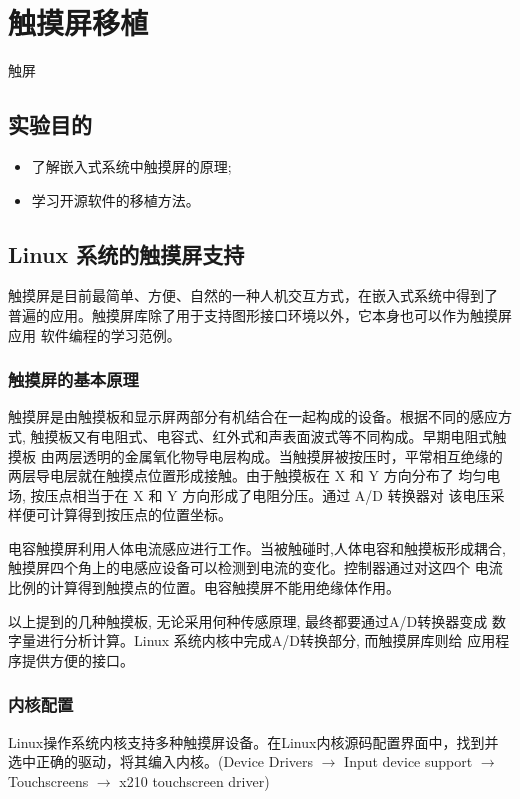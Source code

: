 \chapter{触摸屏移植}{触屏}\label{ch-ts}

\section{实验目的}
\begin{itemize}
  \item 了解嵌入式系统中触摸屏的原理;
  \item 学习开源软件的移植方法。
\end{itemize}

\section{Linux 系统的触摸屏支持}
触摸屏是目前最简单、方便、自然的一种人机交互方式，在嵌入式系统中得到了
普遍的应用。触摸屏库除了用于支持图形接口环境以外，它本身也可以作为触摸屏应用
软件编程的学习范例。

\subsection{触摸屏的基本原理}
触摸屏是由触摸板和显示屏两部分有机结合在一起构成的设备。根据不同的感应方式,
触摸板又有电阻式、电容式、红外式和声表面波式等不同构成。早期电阻式触摸板
由两层透明的金属氧化物导电层构成。当触摸屏被按压时，平常相互绝缘的
两层导电层就在触摸点位置形成接触。由于触摸板在 X 和 Y 方向分布了
均匀电场, 按压点相当于在 X 和 Y 方向形成了电阻分压。通过 A/D 转换器对
该电压采样便可计算得到按压点的位置坐标。

电容触摸屏利用人体电流感应进行工作。当被触碰时,人体电容和触摸板形成耦合, 
触摸屏四个角上的电感应设备可以检测到电流的变化。控制器通过对这四个
电流比例的计算得到触摸点的位置。电容触摸屏不能用绝缘体作用。

以上提到的几种触摸板, 无论采用何种传感原理, 最终都要通过A/D转换器变成
数字量进行分析计算。Linux 系统内核中完成A/D转换部分, 而触摸屏库则给
应用程序提供方便的接口。

\subsection{内核配置}
Linux操作系统内核支持多种触摸屏设备。在Linux内核源码配置界面中，找到并
选中正确的驱动，将其编入内核。(Device Drivers $\to$ Input device support
$\to$ Touchscreens $\to$ x210 touchscreen driver)

